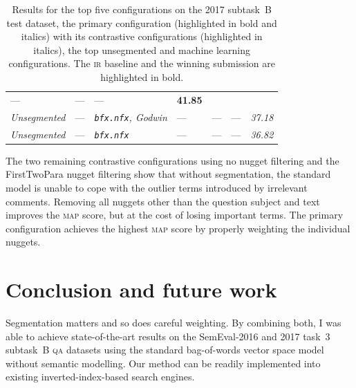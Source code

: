 \documentclass[
  digital, %
  notable, %
  lof,     %
  lot,     %
  nopalatino, color
]{fithesis3}
\newenvironment{liningfigs}{\renewcommand*{\rmdefault}{zpltlf}\normalfont}{}
\def\abbr#1{\textsc{\MakeLowercase{#1}}}
\let\subsubsection=\paragraph
\begin{document}
\begin{table}
\begin{liningfigs}
\begin{tabular}{lllllll}
  --- &
  --- &
  --- &
  \bfseries41.85 \\
\itshape Unsegmented &
  --- &
  \itshape\texttt{bfx.nfx}, Godwin &
  --- &
  --- &
  --- &
  \itshape37.18 \\
\itshape Unsegmented &
  --- &
  \itshape\texttt{bfx.nfx} &
  --- &
  --- &
  --- &
  \itshape36.82 \\
\end{tabular}
\end{liningfigs}
\caption[Results for the top five configurations on the 2017
subtask~B test dataset]{%
  Results for the top five configurations on the 2017
  subtask~B test dataset, the primary configuration (highlighted in bold
  and italics) with its contrastive configurations (highlighted in italics),
  the top unsegmented and machine learning configurations. The
  \abbr{IR} baseline and the winning submission are highlighted in
  bold.}
\label{tab:segmentation-results-2017}
\end{table}

The two remaining contrastive configurations using no nugget filtering and the
FirstTwoPara nugget
filtering show that without segmentation, the standard
model is unable to cope with the outlier terms introduced by irrelevant
comments. Removing all nuggets other than the question subject and text
improves the \abbr{MAP} score, but at the cost of losing important terms. The
primary configuration achieves the highest \abbr{MAP} score by properly
weighting the individual nuggets.

\section{Conclusion and future work}
\label{sec:segmentation-conclusion}
Segmentation matters and so does careful weighting. By combining both, I was
able to achieve state-of-the-art results on the SemEval-2016 and 2017 task~3
subtask~B \abbr{QA} datasets using the standard bag-of-words vector space
model without semantic modelling. Our method can be
readily implemented into existing inverted-index-based search engines.
\end{document}
